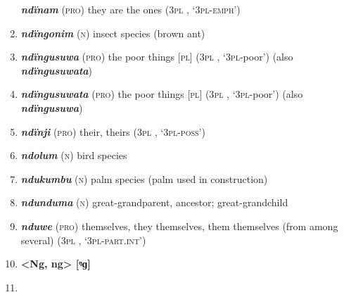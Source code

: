 \begin{enumerate}[noitemsep, label={}, align=left, widest=190, labelsep=1ex,leftmargin=*,itemindent=-10pt]
\textbf{\textit{ndïnam}} (\textsc{pro}) they are the ones (\textsc{3pl} , ‘\textsc{3pl-emph}’) \item 
\textbf{\textit{ndïngonim}} (\textsc{n}) insect species (brown ant) \item 
\textbf{\textit{ndïngusuwa}} (\textsc{pro}) the poor things [\textsc{pl}] (3\textsc{pl} , ‘\textsc{3pl}-poor’) (also \textbf{\textit{ndïngusuwata}}) \item 
\textbf{\textit{ndïngusuwata}} (\textsc{pro}) the poor things [\textsc{pl}] (3\textsc{pl} , ‘\textsc{3pl}-poor’) (also \textbf{\textit{ndïngusuwa}}) \item 
\textbf{\textit{ndïnji}} (\textsc{pro}) their, theirs (\textsc{3pl} , ‘\textsc{3pl-poss}’) \item 
\textbf{\textit{ndolum}} (\textsc{n}) bird species \item 
\textbf{\textit{ndukumbu}} (\textsc{n}) palm species (palm used in construction) \item 
\textbf{\textit{ndunduma}} (\textsc{n}) great-grandparent, ancestor; great-grandchild \item 
\textbf{\textit{nduwe}} (\textsc{pro}) themselves, they themselves, them themselves (from among \linebreak several) (\textsc{3pl} , ‘\textsc{3pl-part.int}’)\\ \item 

\noindent \textbf{<Ng, ng>      [ᵑɡ]}\\ \item 


\end{enumerate}
